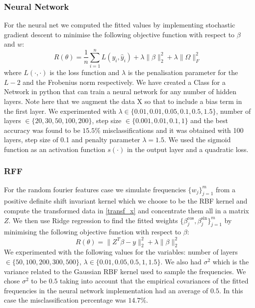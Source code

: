 \documentclass{article} %
\begin{document}
\subsubsection{Neural Network}
For the neural net we computed the fitted values by implementing stochastic gradient descent to minimise the following objective function with respect to $\beta$ and $w$:
 $$ R(\theta) = \frac{1}{n} \sum_{i=1}^{n}L(y_{i}, \hat{y}_{i}) + \lambda \| \beta \|^2 _{2} + \lambda \| \Omega \|^2_{F}$$
 where $L(\cdot,\cdot)$ is the loss function and $\lambda$ is the penalisation parameter for the $L-2$ and the Frobenius norm respectively. 
 We have created a Class for a Network in python that can train a neural network for any number of hidden layers. Note here that we augment the data X so that to include a bias term in the first layer.
 We experimented with $\lambda \in \{ 0.01, 0.01, 0.05, 0.1, 0.5, 1.5\} $,  number of layers $\in \{ 20, 30, 50,  100, 200\} $, step size $ \in \{ 0.001, 0.01, 0.1, 1\}$ and the best accuracy was found to be $15.5\%$ misclassifications and it was obtained with 100 layers, step size of 0.1 and penalty parameter $\lambda = 1.5$. We used the sigmoid function as an activation function $s( \cdot )$ in the output layer and a quadratic loss. 

\subsubsection{RFF}
For the random fourier features case we simulate frequencies
 $ \{ w_{j} \}_{j=1}^{m}$ from a positive definite shift invariant kernel which we choose to be the RBF kernel and compute the transformed 
data in \eqref{transf_x} and concentrate them all in a matrix $Z$.
We then use Ridge regression to find the fitted weights $\{ \beta_{j}^{\cos}, \beta_{j}^{\sin}\}_{j=1}^{m}$
by minimising the following objective function with respect to 
$\beta$:
 $$ R(\theta) = \| Z^{T} \beta - y\|^2_{2} + \lambda \| \beta\|^2 _{2} $$
We experimented with the following values for the variables: number of layers $\in \{ 50,100,200,300,500\}$, $\lambda \in \{ 0.01, 0.05, 0.5, 1, 1.5\}$. We also had  $\sigma^2$ which is the variance related to the Gaussian RBF kernel used to sample the frequencies. We chose  $\sigma^2$ to be $0.5$ taking into account that the empirical covariances of the fitted frequencies in the neural network implementation had an average of $0.5.$ In this case the misclassification percentage was $14.7 \%$.
\end{document}
